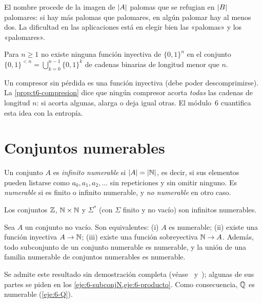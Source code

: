 El nombre procede de la imagen de $\lvert A\rvert$ palomas que se refugian en $\lvert B\rvert$ palomares: si hay más palomas que palomares, en algún palomar hay al menos dos. La dificultad en las aplicaciones está en elegir bien las «palomas» y los «palomares».

\addtocounter{definicion}{1}%

\begin{proposicion}\label{prop:t6-compresion}
Para $n\ge1$ no existe ninguna función inyectiva de $\{0,1\}^{n}$ en el conjunto $\{0,1\}^{<n}=\bigcup_{k=0}^{n-1}\{0,1\}^{k}$ de cadenas binarias de longitud menor que $n$.
\end{proposicion}

Un compresor sin pérdida es una función inyectiva (debe poder descomprimirse). La \cref{prop:t6-compresion} dice que ningún compresor acorta \emph{todas} las cadenas de longitud $n$: si acorta algunas, alarga o deja igual otras. El módulo~6 cuantifica esta idea con la entropía.

\section{Conjuntos numerables}

\begin{definicion}[Numerable]
Un conjunto $A$ es \emph{infinito numerable} si $\lvert A\rvert=\lvert\mathbb{N}\rvert$, es decir, si sus elementos pueden listarse como $a_0,a_1,a_2,\dots$ sin repeticiones y sin omitir ninguno. Es \emph{numerable} si es finito o infinito numerable, y \emph{no numerable} en otro caso.
\end{definicion}

\begin{proposicion}\label{prop:t6-numerables}
Los conjuntos $\mathbb{Z}$, $\mathbb{N}\times\mathbb{N}$ y $\Sigma^{*}$ (con $\Sigma$ finito y no vacío) son infinitos numerables.
\end{proposicion}

\addtocounter{figure}{1}%

\begin{proposicion}\label{prop:t6-criterios}
Sea $A$ un conjunto no vacío. Son equivalentes: (i) $A$ es numerable; (ii) existe una función inyectiva $A\to\mathbb{N}$; (iii) existe una función sobreyectiva $\mathbb{N}\to A$. Además, todo subconjunto de un conjunto numerable es numerable, y la unión de una familia numerable de conjuntos numerables es numerable.
\end{proposicion}

Se admite este resultado sin demostración completa (véase~\cite[§14.2]{hammack} y~\cite[§8.2]{velleman}); algunas de sus partes se piden en los \cref{eje:6-subconjN,eje:6-producto}. Como consecuencia, $\mathbb{Q}$ es numerable (\cref{eje:6-Q}).

